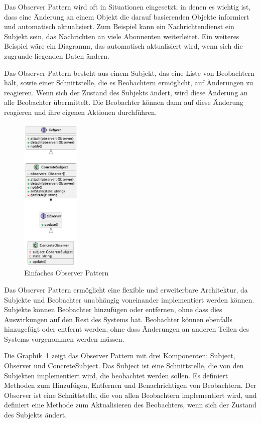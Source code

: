 Das Observer Pattern wird oft in Situationen eingesetzt, in denen es wichtig ist, dass eine Änderung an einem Objekt die darauf basierenden Objekte informiert und automatisch aktualisiert. Zum Beispiel kann ein Nachrichtendienst ein Subjekt sein, das Nachrichten an viele Abonnenten weiterleitet. Ein weiteres Beispiel wäre ein Diagramm, das automatisch aktualisiert wird, wenn sich die zugrunde liegenden Daten ändern.

Das Observer Pattern besteht aus einem Subjekt, das eine Liste von Beobachtern hält, sowie einer Schnittstelle, die es Beobachtern ermöglicht, auf Änderungen zu reagieren. Wenn sich der Zustand des Subjekts ändert, wird diese Änderung an alle Beobachter übermittelt. Die Beobachter können dann auf diese Änderung reagieren und ihre eigenen Aktionen durchführen.
\begin{figure}[ht]
  \centering
  \includegraphics[width=0.25\textwidth]{fig/uml/default-observer.png}
  \caption{Einfaches Observer Pattern}
  \label{fig:default-observer}
\end{figure}

Das Observer Pattern ermöglicht eine flexible und erweiterbare Architektur, da Subjekte und Beobachter unabhängig voneinander implementiert werden können. Subjekte können Beobachter hinzufügen oder entfernen, ohne dass dies Auswirkungen auf den Rest des Systems hat. Beobachter können ebenfalls hinzugefügt oder entfernt werden, ohne dass Änderungen an anderen Teilen des Systems vorgenommen werden müssen.

Die Graphik~\ref{fig:default-observer} zeigt das Observer Pattern mit drei Komponenten: Subject, Observer und ConcreteSubject. Das Subject ist eine Schnittstelle, die von den Subjekten implementiert wird, die beobachtet werden sollen. Es definiert Methoden zum Hinzufügen, Entfernen und Benachrichtigen von Beobachtern. Der Observer ist eine Schnittstelle, die von allen Beobachtern implementiert wird, und definiert eine Methode zum Aktualisieren des Beobachters, wenn sich der Zustand des Subjekts ändert.

